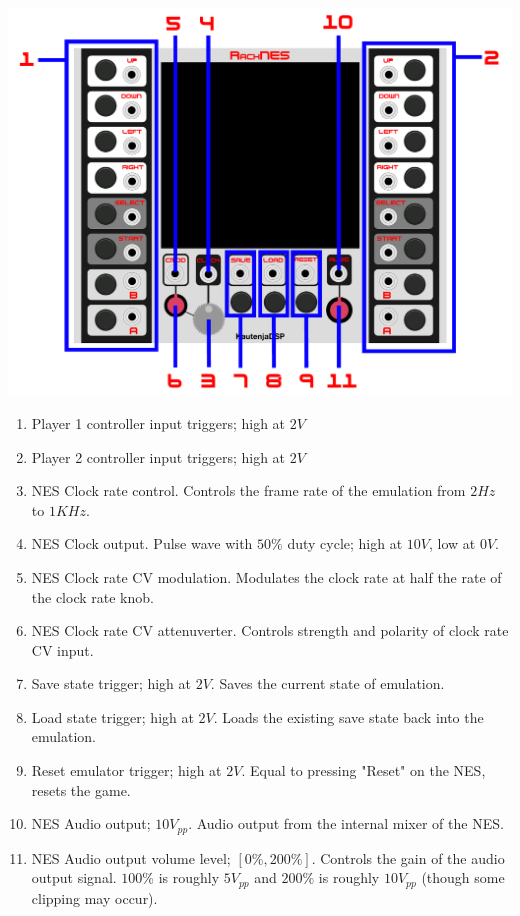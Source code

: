 \documentclass[12pt,a4paper]{article}
\makeatletter
\def\app@exe{\immediate\write18}
\def\bibliographies#1{%
  \app@exe{find #1 -regex ".*bib" | xargs cat | egrep -v "(\%|^$|^\s*$)" > \jobname.references.bib}
  
}
\makeatother
\begin{document}

\includegraphics[width=\textwidth]{RackNES-Manual}
\clearpage

\begin{enumerate}
  \item Player 1 controller input triggers; high at $2V$
  \item Player 2 controller input triggers; high at $2V$
  \item NES Clock rate control. Controls the frame rate of the emulation from
    $2Hz$ to $1KHz$.
  \item NES Clock output. Pulse wave with $50\%$ duty cycle; high at $10V$,
    low at $0V$.
  \item NES Clock rate CV modulation. Modulates the clock rate at half the
    rate of the clock rate knob.
  \item NES Clock rate CV attenuverter. Controls strength and polarity of
    clock rate CV input.
  \item Save state trigger; high at $2V$. Saves the current state of emulation.
  \item Load state trigger; high at $2V$. Loads the existing save state back
    into the emulation.
  \item Reset emulator trigger; high at $2V$. Equal to pressing "Reset" on the
    NES, resets the game.
  \item NES Audio output; $10V_{pp}$. Audio output from the internal mixer of
    the NES.
  \item NES Audio output volume level; $[0\%,200\%]$. Controls the gain of the
    audio output signal. $100\%$ is roughly $5V_{pp}$ and $200\%$ is roughly
    $10V_{pp}$ (though some clipping may occur).
\end{enumerate}

% 
\end{document}
